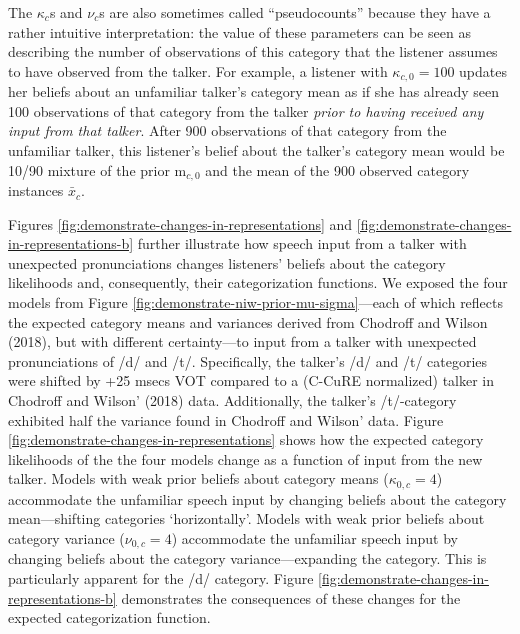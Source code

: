 \documentclass[
  11pt,
  man,floatsintext]{apa6}
\begin{document}
The \(\kappa_{c}\)s and \(\nu_{c}\)s are also sometimes called ``pseudocounts'' because they have a rather intuitive interpretation: the value of these parameters can be seen as describing the number of observations of this category that the listener assumes to have observed from the talker. For example, a listener with \(\kappa_{c,0} = 100\) updates her beliefs about an unfamiliar talker's category mean as if she has already seen 100 observations of that category from the talker \emph{prior to having received any input from that talker}. After 900 observations of that category from the unfamiliar talker, this listener's belief about the talker's category mean would be 10/90 mixture of the prior \(\mathrm{m}_{c,0}\) and the mean of the 900 observed category instances \(\bar{x}_c\).

Figures \ref{fig:demonstrate-changes-in-representations} and \ref{fig:demonstrate-changes-in-representations-b} further illustrate how speech input from a talker with unexpected pronunciations changes listeners' beliefs about the category likelihoods and, consequently, their categorization functions. We exposed the four models from Figure \ref{fig:demonstrate-niw-prior-mu-sigma}---each of which reflects the expected category means and variances derived from Chodroff and Wilson (2018), but with different certainty---to input from a talker with unexpected pronunciations of /d/ and /t/. Specifically, the talker's /d/ and /t/ categories were shifted by +25 msecs VOT compared to a (C-CuRE normalized) talker in Chodroff and Wilson' (2018) data. Additionally, the talker's /t/-category exhibited half the variance found in Chodroff and Wilson' data. Figure \ref{fig:demonstrate-changes-in-representations} shows how the expected category likelihoods of the the four models change as a function of input from the new talker. Models with weak prior beliefs about category means (\(\kappa_{0,c}=4\)) accommodate the unfamiliar speech input by changing beliefs about the category mean---shifting categories `horizontally'. Models with weak prior beliefs about category variance (\(\nu_{0,c}=4\)) accommodate the unfamiliar speech input by changing beliefs about the category variance---expanding the category. This is particularly apparent for the /d/ category. Figure \ref{fig:demonstrate-changes-in-representations-b} demonstrates the consequences of these changes for the expected categorization function.
\end{document}

